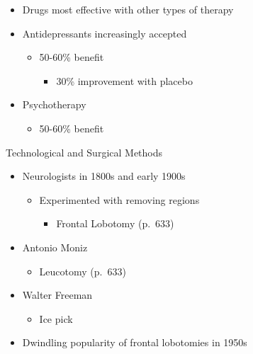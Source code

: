 \documentclass[
]{book}
\providecommand{\tightlist}{%
  \setlength{\itemsep}{0pt}\setlength{\parskip}{0pt}}
\begin{document}
\begin{reflect}
\begin{itemize}
\tightlist
\item
  Drugs most effective with other types of therapy\\
\item
  Antidepressants increasingly accepted

  \begin{itemize}
  \tightlist
  \item
    50-60\% benefit

    \begin{itemize}
    \tightlist
    \item
      30\% improvement with placebo\\
    \end{itemize}
  \end{itemize}
\item
  Psychotherapy

  \begin{itemize}
  \tightlist
  \item
    50-60\% benefit
  \end{itemize}
\end{itemize}

Technological and Surgical Methods

\begin{itemize}
\tightlist
\item
  Neurologists in 1800s and early 1900s

  \begin{itemize}
  \tightlist
  \item
    Experimented with removing regions

    \begin{itemize}
    \tightlist
    \item
      Frontal Lobotomy (p.~633)\\
    \end{itemize}
  \end{itemize}
\item
  Antonio Moniz

  \begin{itemize}
  \tightlist
  \item
    Leucotomy (p.~633)\\
  \end{itemize}
\item
  Walter Freeman

  \begin{itemize}
  \tightlist
  \item
    Ice pick\\
  \end{itemize}
\item
  Dwindling popularity of frontal lobotomies in 1950s
\end{itemize}


\end{reflect}
\end{document}
